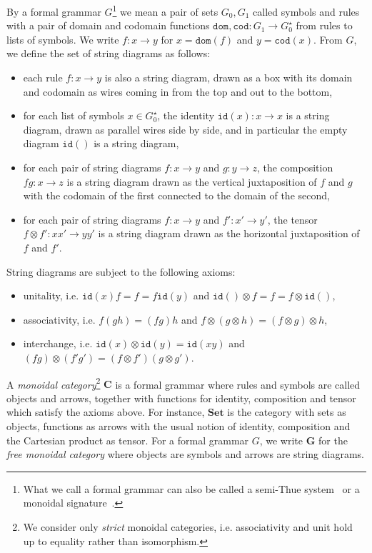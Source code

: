 By a formal grammar $G$\footnote
{What we call a formal grammar can also be called a semi-Thue system~\cite{Thue14} or a monoidal signature~\cite{Selinger10}.}
we mean a pair of sets $G_0, G_1$ called symbols and rules with a pair of domain and codomain functions $\mathtt{dom}, \mathtt{cod} : G_1 \to G_0^\star$ from rules to lists of symbols.
We write $f : x \to y$ for $x = \mathtt{dom}(f)$ and $y = \mathtt{cod}(x)$.
From $G$, we define the set of string diagrams as follows:
\begin{itemize}
\item each rule $f : x \to y$ is also a string diagram, drawn as a box with its domain and codomain as wires coming in from the top and out to the bottom,
\item for each list of symbols $x \in G_0^\star$, the identity $\mathtt{id}(x) : x \to x$ is a string diagram, drawn as parallel wires side by side, and in particular the empty diagram $\mathtt{id}()$ is a string diagram,
\item for each pair of string diagrams $f : x \to y$ and $g : y \to z$, the composition $f g : x \to z$ is a string diagram drawn as the vertical juxtaposition of $f$ and $g$ with the codomain of the first connected to the domain of the second,
\item for each pair of string diagrams $f : x \to y$ and $f' : x' \to y'$, the tensor $f \otimes f' : xx' \to yy'$ is a string diagram drawn as the horizontal juxtaposition of $f$ and $f'$.
\end{itemize}
String diagrams are subject to the following axioms:
\begin{itemize}
\item unitality, i.e. $\mathtt{id}(x) f = f = f \mathtt{id}(y)$ and $\mathtt{id}() \otimes f = f = f \otimes \mathtt{id}()$,
\item associativity, i.e. $f(gh) = (fg)h$ and $f \otimes (g \otimes h) = (f \otimes g) \otimes h$,
\item interchange, i.e. $\mathtt{id}(x) \otimes \mathtt{id}(y) = \mathtt{id}(xy)$ and $(fg) \otimes (f'g') = (f \otimes f')(g \otimes g')$.
\end{itemize}
A \emph{monoidal category}\footnote
{We consider only \emph{strict} monoidal categories, i.e. associativity and unit hold up to equality rather than isomorphism.}
$\mathbf{C}$ is a formal grammar where rules and symbols are called objects and arrows, together with functions for identity, composition and tensor which satisfy the axioms above.
For instance, $\mathbf{Set}$ is the category with sets as objects, functions as arrows with the usual notion of identity, composition and the Cartesian product as tensor.
For a formal grammar $G$, we write $\mathbf{G}$ for the \emph{free monoidal category} where objects are symbols and arrows are string diagrams.

